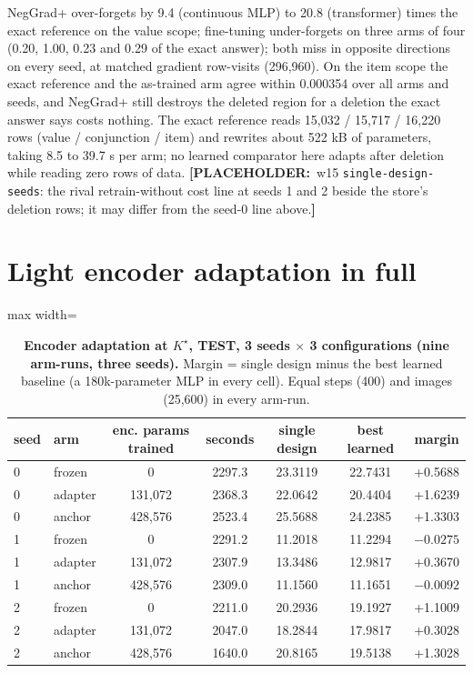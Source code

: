 \documentclass{article} %
\newcommand{\PLACEHOLDER}[1]{{\color{red}\textbf{[PLACEHOLDER:}~#1\textbf{]}}}
\newcommand{\Kstar}{\ensuremath{K^{\star}}}
\begin{document}
\noindent NegGrad+ over-forgets by 9.4 (continuous MLP) to 20.8 (transformer) times the exact
reference on the value scope; fine-tuning under-forgets on three arms of four (0.20, 1.00, 0.23 and
0.29 of the exact answer); both miss in opposite directions on every seed, at matched gradient
row-visits (296,960). On the item scope the exact reference and the as-trained arm agree within
0.000354 over all arms and seeds, and NegGrad+ still destroys the deleted region for a deletion the
exact answer says costs nothing. The exact reference reads 15,032 / 15,717 / 16,220 rows (value /
conjunction / item) and rewrites about 522 kB of parameters, taking 8.5 to 39.7 s per arm; no learned
comparator here adapts after deletion while reading zero rows of data.
\PLACEHOLDER{w15 \texttt{single-design-seeds}: the rival retrain-without cost line at seeds 1 and 2
beside the store's deletion rows; it may differ from the seed-0 line above.}

\section{Light encoder adaptation in full}
\label{app:adapt}

\begin{table}[h]
\centering\small
\caption{\textbf{Encoder adaptation at $\Kstar$, TEST, 3 seeds $\times$ 3 configurations (nine
arm-runs, three seeds).} Margin = single design minus the best learned baseline (a 180k-parameter %
MLP in every cell). Equal steps (400) and images (25,600) in every arm-run.} %
\label{tab:adapt}
\setlength{\tabcolsep}{3pt}
\begin{adjustbox}{max width=\linewidth}\begin{tabular}{llccccc}
\toprule
seed & arm & enc. params trained & seconds & single design & best learned & margin \\
\midrule
0 & frozen & 0 & 2297.3 & 23.3119 & 22.7431 & +0.5688 \\
0 & adapter & 131,072 & 2368.3 & 22.0642 & 20.4404 & +1.6239 \\
0 & anchor & 428,576 & 2523.4 & 25.5688 & 24.2385 & +1.3303 \\
1 & frozen & 0 & 2291.2 & 11.2018 & 11.2294 & $-0.0275$ \\
1 & adapter & 131,072 & 2307.9 & 13.3486 & 12.9817 & +0.3670 \\
1 & anchor & 428,576 & 2309.0 & 11.1560 & 11.1651 & $-0.0092$ \\
2 & frozen & 0 & 2211.0 & 20.2936 & 19.1927 & +1.1009 \\
2 & adapter & 131,072 & 2047.0 & 18.2844 & 17.9817 & +0.3028 \\
2 & anchor & 428,576 & 1640.0 & 20.8165 & 19.5138 & +1.3028 \\
\bottomrule
\end{tabular}\end{adjustbox}
\end{table}
\end{document}
